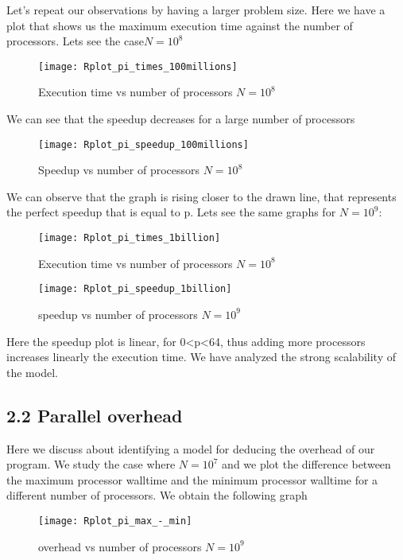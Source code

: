\documentclass[11pt]{scrartcl} %
\begin{document}
Let's repeat our observations by having a larger problem size.
Here we have a plot that shows us the maximum execution time against the number of processors. Lets see the case$ N=10^8$
\begin{figure}[H] %
	\centering
	\texttt{[image: Rplot\_pi\_times\_100millions]} %
	\caption{Execution time vs number of processors $N= 10^8$}
\end{figure}
We can see that the speedup  decreases for a large number of processors
\begin{figure}[H] %
	\centering
	\texttt{[image: Rplot\_pi\_speedup\_100millions]} %
	\caption{Speedup vs number of processors $N=10^8$}
\end{figure}
We can observe that the graph is rising closer to the drawn line, that represents the perfect speedup that is equal to p.
Lets see the same graphs for $N=10^9$:
\begin{figure}[H] %
	\centering
	\texttt{[image: Rplot\_pi\_times\_1billion]} %
	\caption{ Execution time vs number of processors $N= 10^8$}
\end{figure}
\begin{figure}[H] %
	\centering
	\texttt{[image: Rplot\_pi\_speedup\_1billion]} %
	\caption{speedup vs number of processors $N= 10^9$}
\end{figure}

Here the speedup plot is linear, for 0<p<64, thus adding more processors increases linearly the execution time.
 We have analyzed the strong scalability of the model. 
\subsection{2.2 Parallel overhead}
Here we discuss about identifying a model for deducing the overhead of our program. We study the case where $N=10^7$ and we plot the difference between the maximum processor walltime
 and the minimum processor walltime for a different number of processors.
We obtain the following graph
\begin{figure}[H] %
	\centering
	\texttt{[image: Rplot\_pi\_max\_-\_min]} %
	\caption{overhead vs number of processors $N= 10^9$}
\end{figure}
\end{document}
